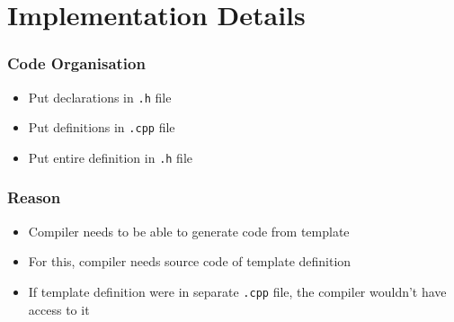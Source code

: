 \section{Implementation Details}

\frame{\tableofcontents[currentsection]}

\begin{frame}
  \frametitle{Code Organisation}
  \begin{itemize}
    \item Put declarations in \texttt{.h} file
    \item Put definitions in \texttt{.cpp} file
  \end{itemize}
  \vskip5mm
  \begin{itemize}
    \item Put entire definition in \texttt{.h} file
  \end{itemize}
\end{frame}

\begin{frame}
  \frametitle{Reason}
  \begin{itemize}
    \item Compiler needs to be able to generate code from template
    \item For this, compiler needs source code of template definition
    \item If template definition were in separate \texttt{.cpp} file, the compiler wouldn't have access to it
  \end{itemize}
\end{frame}



